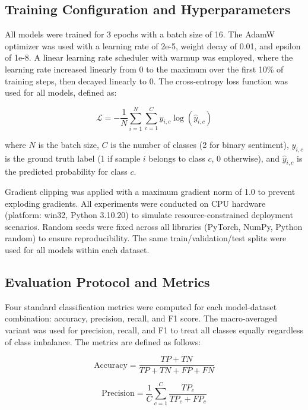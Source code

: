 \documentclass[conference]{IEEEtran}
\begin{document}
\subsection{Training Configuration and Hyperparameters}

All models were trained for 3 epochs with a batch size of 16. The AdamW optimizer was used with a learning rate of 2e-5, weight decay of 0.01, and epsilon of 1e-8. A linear learning rate scheduler with warmup was employed, where the learning rate increased linearly from 0 to the maximum over the first 10\% of training steps, then decayed linearly to 0. The cross-entropy loss function was used for all models, defined as:

\begin{equation}
\mathcal{L} = -\frac{1}{N} \sum_{i=1}^{N} \sum_{c=1}^{C} y_{i,c} \log(\hat{y}_{i,c})
\end{equation}

where $N$ is the batch size, $C$ is the number of classes (2 for binary sentiment), $y_{i,c}$ is the ground truth label (1 if sample $i$ belongs to class $c$, 0 otherwise), and $\hat{y}_{i,c}$ is the predicted probability for class $c$.

Gradient clipping was applied with a maximum gradient norm of 1.0 to prevent exploding gradients. All experiments were conducted on CPU hardware (platform: win32, Python 3.10.20) to simulate resource-constrained deployment scenarios. Random seeds were fixed across all libraries (PyTorch, NumPy, Python random) to ensure reproducibility. The same train/validation/test splits were used for all models within each dataset.

\subsection{Evaluation Protocol and Metrics}

Four standard classification metrics were computed for each model-dataset combination: accuracy, precision, recall, and F1 score. The macro-averaged variant was used for precision, recall, and F1 to treat all classes equally regardless of class imbalance. The metrics are defined as follows:

\begin{equation}
\text{Accuracy} = \frac{TP + TN}{TP + TN + FP + FN}
\end{equation}

\begin{equation}
\text{Precision} = \frac{1}{C} \sum_{c=1}^{C} \frac{TP_c}{TP_c + FP_c}
\end{equation}
\end{document}
